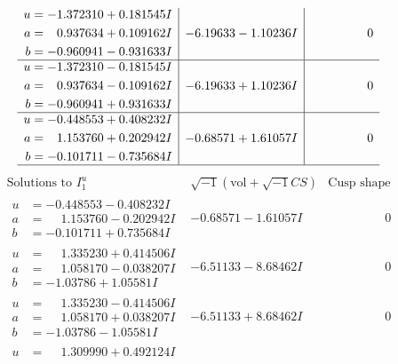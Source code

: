 \documentclass[1p]{elsarticle_modified}
\theoremstyle{definition}
\newcommand{\I}{\sqrt{-1}}
\begin{document}
$$\begin{array}{c|c|c}
\begin{aligned}
u &= -1.372310 + 0.181545 I \\
a &= \phantom{-}0.937634 + 0.109162 I \\
b &= -0.960941 - 0.931633 I\end{aligned}
 & -6.19633 - 1.10236 I & \phantom{-0.000000 } 0 \\ \hline\begin{aligned}
u &= -1.372310 - 0.181545 I \\
a &= \phantom{-}0.937634 - 0.109162 I \\
b &= -0.960941 + 0.931633 I\end{aligned}
 & -6.19633 + 1.10236 I & \phantom{-0.000000 } 0 \\ \hline\begin{aligned}
u &= -0.448553 + 0.408232 I \\
a &= \phantom{-}1.153760 + 0.202942 I \\
b &= -0.101711 - 0.735684 I\end{aligned}
 & -0.68571 + 1.61057 I & \phantom{-0.000000 } 0\\
 \hline 
 \end{array}$$\newpage$$\begin{array}{c|c|c}  
\text{Solutions to }I^u_{1}& \I (\text{vol} + \sqrt{-1}CS) & \text{Cusp shape}\\
 \hline 
\begin{aligned}
u &= -0.448553 - 0.408232 I \\
a &= \phantom{-}1.153760 - 0.202942 I \\
b &= -0.101711 + 0.735684 I\end{aligned}
 & -0.68571 - 1.61057 I & \phantom{-0.000000 } 0 \\ \hline\begin{aligned}
u &= \phantom{-}1.335230 + 0.414506 I \\
a &= \phantom{-}1.058170 - 0.038207 I \\
b &= -1.03786 + 1.05581 I\end{aligned}
 & -6.51133 - 8.68462 I & \phantom{-0.000000 } 0 \\ \hline\begin{aligned}
u &= \phantom{-}1.335230 - 0.414506 I \\
a &= \phantom{-}1.058170 + 0.038207 I \\
b &= -1.03786 - 1.05581 I\end{aligned}
 & -6.51133 + 8.68462 I & \phantom{-0.000000 } 0 \\ \hline\begin{aligned}
u &= \phantom{-}1.309990 + 0.492124 I \\

\end{aligned}
\end{array}$$
\end{document}
